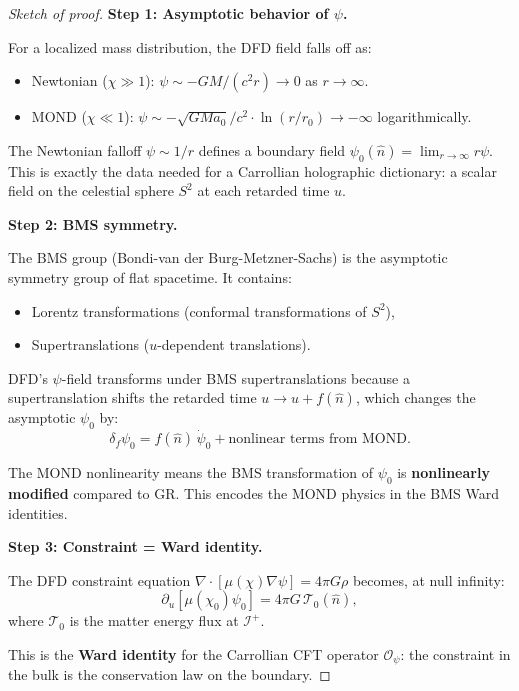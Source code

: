\documentclass[11pt,a4paper]{article}
\begin{document}
\begin{proof}[Sketch of proof]
\textbf{Step 1: Asymptotic behavior of $\psi$.}

For a localized mass distribution, the DFD field falls off as:
\begin{itemize}
\item Newtonian ($\chi \gg 1$): $\psi \sim -GM/(c^2 r) \to 0$ as $r \to \infty$.
\item MOND ($\chi \ll 1$): $\psi \sim -\sqrt{GMa_0}/c^2\cdot\ln(r/r_0) \to -\infty$ logarithmically.
\end{itemize}

The Newtonian falloff $\psi \sim 1/r$ defines a boundary field $\psi_0(\hat{n}) = \lim_{r\to\infty} r\psi$. This is exactly the data needed for a Carrollian holographic dictionary: a scalar field on the celestial sphere $S^2$ at each retarded time $u$.

\textbf{Step 2: BMS symmetry.}

The BMS group (Bondi-van der Burg-Metzner-Sachs) is the asymptotic symmetry group of flat spacetime. It contains:
\begin{itemize}
\item Lorentz transformations (conformal transformations of $S^2$),
\item Supertranslations ($u$-dependent translations).
\end{itemize}

DFD's $\psi$-field transforms under BMS supertranslations because a supertranslation shifts the retarded time $u \to u + f(\hat{n})$, which changes the asymptotic $\psi_0$ by:
\begin{equation}
\delta_f\psi_0 = f(\hat{n})\,\dot\psi_0 + \text{nonlinear terms from MOND}.
\end{equation}

The MOND nonlinearity means the BMS transformation of $\psi_0$ is \textbf{nonlinearly modified} compared to GR. This encodes the MOND physics in the BMS Ward identities.

\textbf{Step 3: Constraint = Ward identity.}

The DFD constraint equation $\nabla\cdot[\mu(\chi)\nabla\psi] = 4\pi G\rho$ becomes, at null infinity:
\begin{equation}
\partial_u\left[\mu(\chi_0)\psi_0\right] = 4\pi G\,\mathcal{T}_0(\hat{n}),
\end{equation}
where $\mathcal{T}_0$ is the matter energy flux at $\mathscr{I}^+$.

This is the \textbf{Ward identity} for the Carrollian CFT operator $\mathcal{O}_\psi$: the constraint in the bulk is the conservation law on the boundary.
\end{proof}
\end{document}
